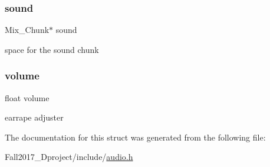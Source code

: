 \mbox{\label{structsound__s_a0bb45d52afdd032f48e17a8519361d54}} 
\subsubsection{\texorpdfstring{sound}{sound}}
{\footnotesize\ttfamily Mix\+\_\+\+Chunk$\ast$ sound}



space for the sound chunk 

\mbox{\label{structsound__s_a016abda2855c77dcc1630f9d2f9f8d18}} 
\subsubsection{\texorpdfstring{volume}{volume}}
{\footnotesize\ttfamily float volume}



earrape adjuster 



The documentation for this struct was generated from the following file\+:\begin{DoxyCompactItemize}
\item 
Fall2017\+\_\+Dproject/include/\hyperlink{audio_8h}{audio.\+h}\end{DoxyCompactItemize}
